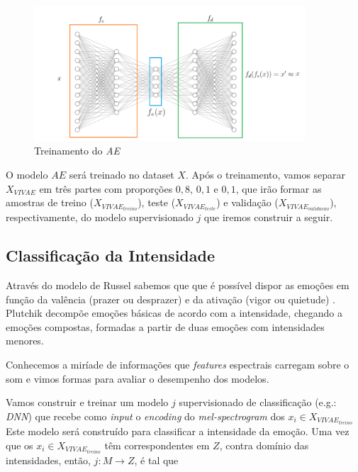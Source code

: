 \begin{figure}[!h]
\centering
\includegraphics[width=0.9\textwidth]{imagens/p-autoencoder.png}
\caption{\label{fig:treinamentoae}Treinamento do \textit{AE}}
\end{figure}

O modelo $AE$ será treinado no dataset $X$. Após o treinamento, vamos separar $X_{VIVAE}$ em três partes com proporções $0,8$, $0,1$ e $0,1$, que irão formar as amostras de treino ($X_{VIVAE_{treino}}$), teste ($X_{VIVAE_{teste}}$) e validação ($X_{VIVAE_{validacao}}$), respectivamente, do modelo supervisionado $j$ que iremos construir a seguir.

\subsection{Classificação da Intensidade}

Através do modelo de Russel sabemos que que é possível dispor as emoções em função da valência (prazer ou desprazer) e da ativação (vigor ou quietude) \cite{27}. Plutchik decompõe emoções básicas de acordo com a intensidade, chegando a emoções compostas, formadas a partir de duas emoções com intensidades menores.

Conhecemos a miríade de informações que \textit{features} espectrais carregam sobre o som e vimos formas para avaliar o desempenho dos modelos.

Vamos construir e treinar um modelo $j$ supervisionado de classificação (e.g.: \textit{DNN}) que recebe como \textit{input} o \textit{encoding} do \textit{mel-spectrogram} dos $x_i \in X_{VIVAE_{treino}}$ Este modelo será construído para classificar a intensidade da emoção. Uma vez que os $x_i \in X_{VIVAE_{treino}}$ têm correspondentes em $Z$, contra domínio das intensidades, então, $j: M \rightarrow Z$, é tal que

